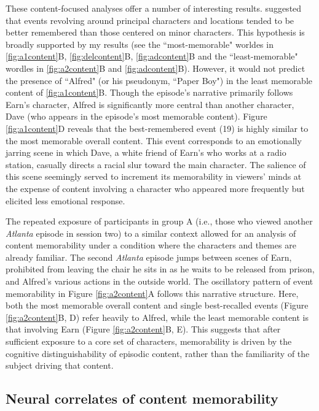 \documentclass{article}
\begin{document}
These content-focused analyses offer a number of interesting results.  \cite{HeusEtal18c} suggested that events revolving around principal characters and locations tended to be better remembered than those centered on minor characters.  This hypothesis is broadly supported by my results (see the ``most-memorable" worldes in \ref{fig:a1content}B, \ref{fig:delcontent}B, \ref{fig:adcontent}B and the ``least-memorable" wordles in \ref{fig:a2content}B and \ref{fig:adcontent}B).  However, it would not predict the presence of ``Alfred" (or his pseudonym, ``Paper Boy") in the least memorable content of \ref{fig:a1content}B.  Though the episode's narrative primarily follows Earn's character, Alfred is significantly more central than another character, Dave (who appears in the episode's most memorable content).  Figure \ref{fig:a1content}D reveals that the best-remembered event (19) is highly similar to the most memorable overall content.  This event corresponds to an emotionally jarring scene in which Dave, a white friend of Earn's who works at a radio station, casually directs a racial slur toward the main character.  The salience of this scene seemingly served to increment its memorability in viewers' minds at the expense of content involving a character who appeared more frequently but elicited less emotional response.

The repeated exposure of participants in group A (i.e., those who viewed another \textit{Atlanta} episode in session two) to a similar context allowed for an analysis of content memorability under a condition where the characters and themes are already familiar.  The second \textit{Atlanta} episode jumps between scenes of Earn, prohibited from leaving the chair he sits in as he waits to be released from prison, and Alfred's various actions in the outside world.  The oscillatory pattern of event memorability in Figure \ref{fig:a2content}A follows this narrative structure.  Here, both the most memorable overall content and single best-recalled events (Figure \ref{fig:a2content}B, D) refer heavily to Alfred, while the least memorable content is that involving Earn (Figure \ref{fig:a2content}B, E).  This suggests that after sufficient exposure to a core set of characters, memorability is driven by the cognitive distinguishability of episodic content, rather than the familiarity of the subject driving that content.
\FloatBarrier


\subsection*{Neural correlates of content memorability}\label{sec:brainresults}
\end{document}
